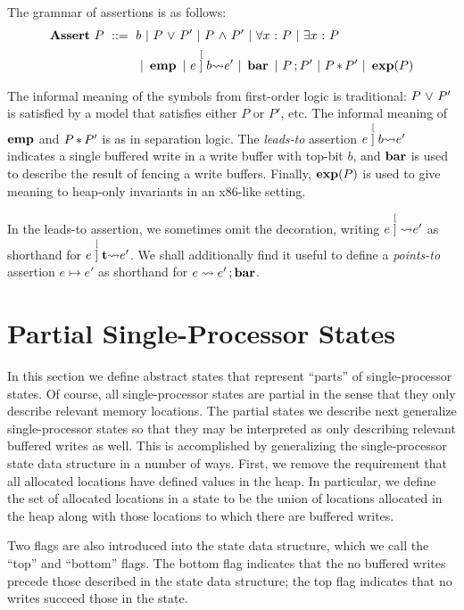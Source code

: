 \documentclass[11pt]{report}
\begin{document}
The grammar of assertions is as follows: 
\begin{align*}
	\mathbf{Assert}~P ~::=~ {} & b ~|~ P \operatorname{\,\vee\,} P' ~|~ P \operatorname{\,\wedge\,} P' ~|~ \forall x \operatorname{\,:\,} P ~|~ \exists x \operatorname{\,:\,} P \\
	&  ~|~ \operatorname{\mathbf{emp}} ~|~ e \stackrel[]{b}{\leadsto} e' ~|~ \operatorname{\mathbf{bar}} ~|~ P \operatorname{;} P' ~|~ P \operatorname{\ast} P' ~|~ \operatorname{\mathbf{exp}}(P)
\end{align*} 

The informal meaning of the symbols from first-order logic is traditional: $P \operatorname{\,\vee\,} P'$ is satisfied by a model that satisfies either $P$ or $P'$, etc. The informal meaning of $\operatorname{\mathbf{emp}}$ and $P \operatorname{\ast} P'$ is as in separation logic. The \emph{leads-to} assertion $e \stackrel[]{b}{\leadsto} e'$ indicates a single buffered write in a write buffer with top-bit $b$, and $\operatorname{\mathbf{bar}}$ is used to describe the result of fencing a write buffers. Finally, $\operatorname{\mathbf{exp}}(P)$ is used to give meaning to heap-only invariants in an x86-like setting.

In the leads-to assertion, we sometimes omit the decoration, writing $e \stackrel[]{}{\leadsto} e'$ as shorthand for $e \stackrel[]{\ensuremath{\mathbf{t}}}{\leadsto} e'$. We shall additionally find it useful to define a \emph{points-to} assertion $e \mapsto e'$ as shorthand for $e \leadsto e' \operatorname{;} \operatorname{\mathbf{bar}}$. 


\section{Partial Single-Processor States} %
\label{sec:partial_states}

In this section we define abstract states that represent ``parts'' of single-processor states. Of course, all single-processor states are partial in the sense that they only describe relevant memory locations. The partial states we describe next generalize single-processor states so that they may be interpreted as only describing relevant buffered writes as well. This is accomplished by generalizing the single-processor state data structure in a number of ways. First, we remove the requirement that all allocated locations have defined values in the heap. In particular, we define the set of allocated locations in a state to be the union of locations allocated in the heap along with those locations to which there are buffered writes.  

Two flags are also introduced into the state data structure, which we call the ``top'' and ``bottom'' flags. The bottom flag indicates that the no buffered writes precede those described in the state data structure; the top flag indicates that no writes succeed those in the state. 
\end{document}
